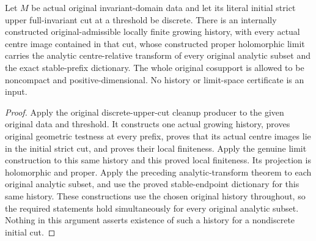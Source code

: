 \begin{theorem}
\label{hir:original-discrete-cut-actual-analytic-limit-transforms}
\leanok
Let $M$ be actual original invariant-domain data and let its literal initial
strict upper full-invariant cut at a threshold be discrete. There is an
internally constructed original-admissible locally finite growing history,
with every actual centre image contained in that cut, whose constructed
proper holomorphic limit carries the analytic centre-relative transform
of every original analytic subset and the exact stable-prefix dictionary.
The whole original cosupport is allowed to be noncompact and
positive-dimensional. No history or limit-space certificate is an input.
\end{theorem}
\begin{proof}
Apply the original discrete-upper-cut cleanup producer to the given original
data and threshold. It constructs one actual growing history, proves original
geometric testness at every prefix, proves that its actual centre images
lie in the initial strict cut, and proves their local finiteness. Apply the
genuine limit construction to this same history and this proved local
finiteness. Its projection is holomorphic and proper. Apply the preceding
analytic-transform theorem to each original analytic subset, and use the
proved stable-endpoint dictionary for this same history. These constructions
use the chosen original history throughout, so the required statements hold
simultaneously for every original analytic subset. Nothing in this argument
asserts existence of such a history for a nondiscrete initial cut.
\end{proof}
